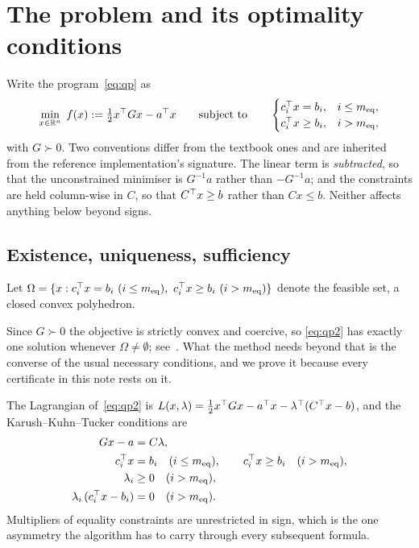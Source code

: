 \section{The problem and its optimality conditions}
\label{sec:problem}

Write the program~\eqref{eq:qp} as
\begin{equation}
  \min_{x \in \mathbb{R}^n} \; f(x) := \tfrac12 x^{\top} G x - a^{\top} x
  \qquad \text{subject to} \qquad
  \begin{cases}
    c_i^{\top} x = b_i, & i \le m_{\mathrm{eq}},\\
    c_i^{\top} x \ge b_i, & i > m_{\mathrm{eq}},
  \end{cases}
  \label{eq:qp2}
\end{equation}
with $G \succ 0$. Two conventions differ from the textbook ones and are inherited
from the reference implementation's signature.
The linear term is \emph{subtracted}, so that the unconstrained minimiser is
$G^{-1}a$ rather than $-G^{-1}a$; and the constraints are held column-wise in
$C$, so that $C^{\top} x \ge b$ rather than $Cx \le b$. Neither affects anything
below beyond signs.

\subsection{Existence, uniqueness, sufficiency}

Let $\Omega = \{x : c_i^{\top} x = b_i \ (i \le m_{\mathrm{eq}}),\ c_i^{\top} x \ge b_i \
(i > m_{\mathrm{eq}})\}$ denote the feasible set, a closed convex polyhedron.

Since $G \succ 0$ the objective is strictly convex and coercive, so \eqref{eq:qp2} has exactly one solution whenever $\Omega \neq \emptyset$; see~\cite[Ch.~16]{nocedal2006}. What the method needs beyond that is the converse of the usual necessary conditions, and we prove it because every certificate in this note rests on it.

The Lagrangian of~\eqref{eq:qp2} is
$L(x,\lambda) = \tfrac12 x^{\top} G x - a^{\top} x - \lambda^{\top}(C^{\top} x - b)$, and the
Karush--Kuhn--Tucker conditions are
\begin{align}
  G x - a &= C \lambda, \label{eq:stat}\\
  c_i^{\top} x &= b_i \quad (i \le m_{\mathrm{eq}}), \qquad
  c_i^{\top} x \ge b_i \quad (i > m_{\mathrm{eq}}), \label{eq:pfeas}\\
  \lambda_i &\ge 0 \quad (i > m_{\mathrm{eq}}), \label{eq:dfeas}\\
  \lambda_i\,(c_i^{\top} x - b_i) &= 0 \quad (i > m_{\mathrm{eq}}). \label{eq:comp}
\end{align}
Multipliers of equality constraints are unrestricted in sign, which is the one
asymmetry the algorithm has to carry through every subsequent formula.

